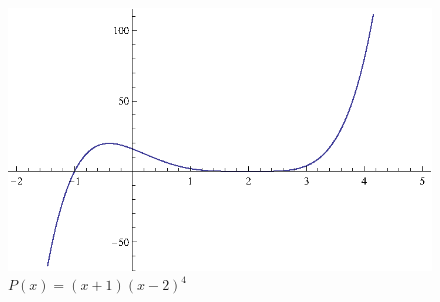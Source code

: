 \documentclass{exam}
\begin{document}
\begin{enumerate}
      \begin{figure}[H]
        \centering
        \includegraphics[scale=0.9]{graph3.eps}
        \caption*{$P(x) = (x + 1)(x - 2)^4$}
      \end{figure}
  \end{enumerate}
\end{document}
